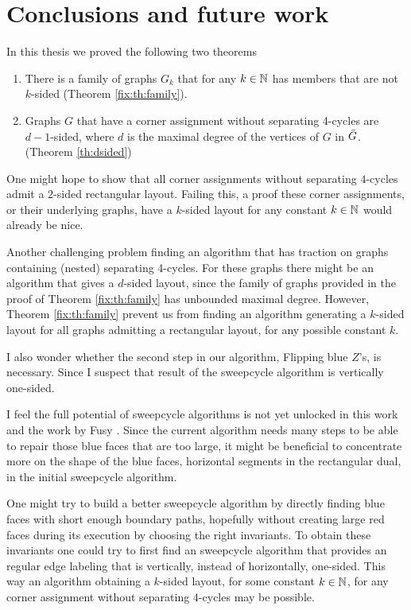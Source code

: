 
\thispagestyle{plain}
\section{Conclusions and future work}

In this thesis we proved the following two theorems

\begin{enumerate}
  \item There is a family of graphs $G_k$ that for any $k \in \mathbb{N}$ has members that are not $k$-sided (Theorem \ref{fix:th:family}).
  \item Graphs $G$ that have a corner assignment without separating 4-cycles are $d-1$-sided, where $d$ is the maximal degree of the vertices of $G$ in $\bar{G}$. (Theorem \ref{th:dsided})
\end{enumerate}

One might hope to show that all corner assignments without separating $4$-cycles admit a $2$-sided rectangular layout. Failing this, a proof these corner assignments, or their underlying graphs, have a $k$-sided layout for any constant $k\in \mathbb{N}$ would already be nice.

Another challenging problem finding an algorithm that has traction on graphs containing (nested) separating 4-cycles.
For these graphs there might be an algorithm that gives a $d$-sided layout, since the family of graphs provided in the proof of Theorem \ref{fix:th:family} has unbounded maximal degree.
However, Theorem \ref{fix:th:family} prevent us from finding an algorithm generating a $k$-sided layout for all graphs admitting a rectangular layout, for any possible constant $k$.

I also wonder whether the second step in our algorithm, Flipping blue $Z$'s, is necessary.
Since I suspect that result of the sweepcycle algorithm is vertically one-sided.

I feel the full potential of sweepcycle algorithms is not yet unlocked in this work and the work by Fusy \cite{Fusy2006}.
Since the current algorithm needs many steps to be able to repair those blue faces that are too large, it might be beneficial to concentrate more on the shape of the blue faces, horizontal segments in the rectangular dual, in the initial sweepcycle algorithm.

One might try to build a better sweepcycle algorithm by directly finding blue faces with short enough boundary paths, hopefully without creating large red faces during its execution by choosing the right invariants.
To obtain these invariants one could try to first find an sweepcycle algorithm that provides an regular edge labeling that is vertically, instead of horizontally, one-sided.
This way an algorithm obtaining a $k$-sided layout, for some constant $k \in \mathbb{N}$, for any corner assignment without separating $4$-cycles may be possible.

